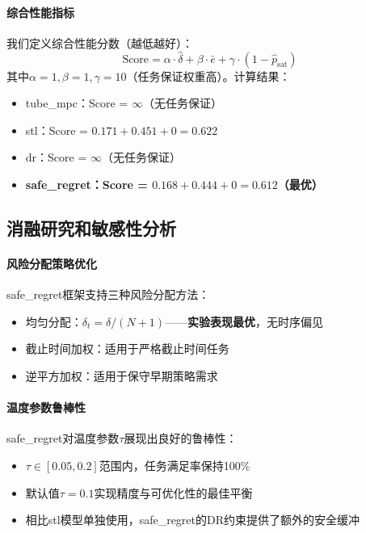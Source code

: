 \documentclass[12pt,a4paper]{ctexart}
\numberwithin{equation}{section}
\begin{document}
\paragraph*{综合性能指标}

我们定义综合性能分数（越低越好）：
\begin{equation}
    \text{Score} = \alpha \cdot \widehat{\delta} + \beta \cdot \bar{e} + \gamma \cdot (1 - \widehat{p}_{\mathrm{sat}})
    \label{eq:score}
\end{equation}
其中$\alpha=1, \beta=1, \gamma=10$（任务保证权重高）。计算结果：
\begin{itemize}
    \item tube\_mpc：Score = $\infty$（无任务保证）
    \item stl：Score = $0.171 + 0.451 + 0 = 0.622$
    \item dr：Score = $\infty$（无任务保证）
    \item \textbf{safe\_regret：Score = $0.168 + 0.444 + 0 = 0.612$（最优）}
\end{itemize}

\subsection{消融研究和敏感性分析}

\paragraph*{风险分配策略优化}

safe\_regret框架支持三种风险分配方法：
\begin{itemize}
    \item 均匀分配：$\delta_t = \delta/(N+1)$——\textbf{实验表现最优}，无时序偏见
    \item 截止时间加权：适用于严格截止时间任务
    \item 逆平方加权：适用于保守早期策略需求
\end{itemize}

\paragraph*{温度参数鲁棒性}

safe\_regret对温度参数$\tau$展现出良好的鲁棒性：
\begin{itemize}
    \item $\tau \in [0.05, 0.2]$范围内，任务满足率保持100\%
    \item 默认值$\tau = 0.1$实现精度与可优化性的最佳平衡
    \item 相比stl模型单独使用，safe\_regret的DR约束提供了额外的安全缓冲
\end{itemize}
\end{document}
